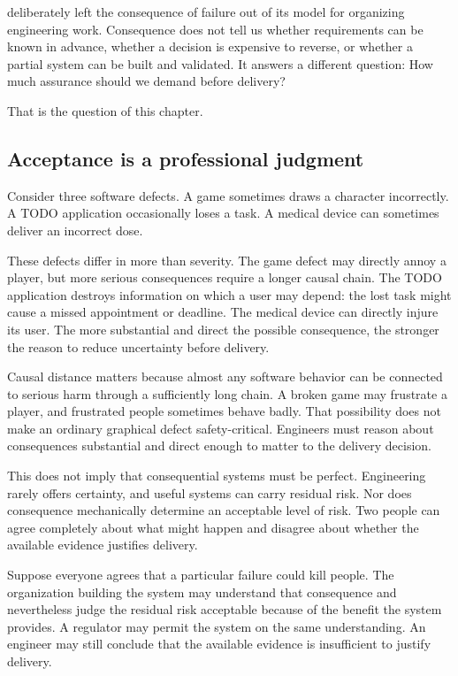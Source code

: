 \citet{ch-process} deliberately left the consequence of failure out of its model for organizing
engineering work. Consequence does not tell us whether requirements can be known in advance,
whether a decision is expensive to reverse, or whether a partial system can be built and validated.
It answers a different question: How much assurance should we demand before delivery?

That is the question of this chapter.

\subsection{Acceptance is a professional judgment}\label{sec-professional-judgment}

Consider three software defects. A game sometimes draws a character incorrectly. A TODO application
occasionally loses a task. A medical device can sometimes deliver an incorrect dose.

These defects differ in more than severity. The game defect may directly annoy a player, but more
serious consequences require a longer causal chain. The TODO application destroys information on
which a user may depend: the lost task might cause a missed appointment or deadline. The medical
device can directly injure its user. The more substantial and direct the possible consequence, the
stronger the reason to reduce uncertainty before delivery.

Causal distance matters because almost any software behavior can be connected to serious harm
through a sufficiently long chain. A broken game may frustrate a player, and frustrated people
sometimes behave badly. That possibility does not make an ordinary graphical defect
safety-critical. Engineers must reason about consequences substantial and direct enough to matter
to the delivery decision.

This does not imply that consequential systems must be perfect. Engineering rarely offers
certainty, and useful systems can carry residual risk. Nor does consequence mechanically determine
an acceptable level of risk. Two people can agree completely about what might happen and disagree
about whether the available evidence justifies delivery.

Suppose everyone agrees that a particular failure could kill people. The organization building the
system may understand that consequence and nevertheless judge the residual risk acceptable because
of the benefit the system provides. A regulator may permit the system on the same understanding. An
engineer may still conclude that the available evidence is insufficient to justify delivery.

